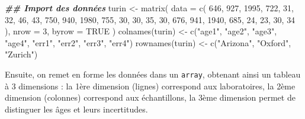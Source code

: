 \documentclass[
  french,
]{scrbook}
\newenvironment{Shaded}{\begin{snugshade}}{\end{snugshade}}
\newcommand{\AttributeTok}[1]{\textcolor[rgb]{0.77,0.63,0.00}{#1}}
\newcommand{\ConstantTok}[1]{\textcolor[rgb]{0.00,0.00,0.00}{#1}}
\newcommand{\DecValTok}[1]{\textcolor[rgb]{0.00,0.00,0.81}{#1}}
\newcommand{\DocumentationTok}[1]{\textcolor[rgb]{0.56,0.35,0.01}{\textbf{\textit{#1}}}}
\newcommand{\FunctionTok}[1]{\textcolor[rgb]{0.00,0.00,0.00}{#1}}
\newcommand{\NormalTok}[1]{#1}
\newcommand{\OtherTok}[1]{\textcolor[rgb]{0.56,0.35,0.01}{#1}}
\newcommand{\StringTok}[1]{\textcolor[rgb]{0.31,0.60,0.02}{#1}}
\begin{document}
\begin{Shaded}
\begin{Highlighting}[]
\DocumentationTok{\#\# Import des données}
\NormalTok{turin }\OtherTok{\textless{}{-}} \FunctionTok{matrix}\NormalTok{(}
  \AttributeTok{data =} \FunctionTok{c}\NormalTok{( }
    \DecValTok{646}\NormalTok{, }\DecValTok{927}\NormalTok{, }\DecValTok{1995}\NormalTok{, }\DecValTok{722}\NormalTok{, }\DecValTok{31}\NormalTok{, }\DecValTok{32}\NormalTok{, }\DecValTok{46}\NormalTok{, }\DecValTok{43}\NormalTok{,}
    \DecValTok{750}\NormalTok{, }\DecValTok{940}\NormalTok{, }\DecValTok{1980}\NormalTok{, }\DecValTok{755}\NormalTok{, }\DecValTok{30}\NormalTok{, }\DecValTok{30}\NormalTok{, }\DecValTok{35}\NormalTok{, }\DecValTok{30}\NormalTok{,}
    \DecValTok{676}\NormalTok{, }\DecValTok{941}\NormalTok{, }\DecValTok{1940}\NormalTok{, }\DecValTok{685}\NormalTok{, }\DecValTok{24}\NormalTok{, }\DecValTok{23}\NormalTok{, }\DecValTok{30}\NormalTok{, }\DecValTok{34}
\NormalTok{  ),}
  \AttributeTok{nrow =} \DecValTok{3}\NormalTok{,}
  \AttributeTok{byrow =} \ConstantTok{TRUE}
\NormalTok{)}
\FunctionTok{colnames}\NormalTok{(turin) }\OtherTok{\textless{}{-}} \FunctionTok{c}\NormalTok{(}\StringTok{"age1"}\NormalTok{, }\StringTok{"age2"}\NormalTok{, }\StringTok{"age3"}\NormalTok{, }\StringTok{"age4"}\NormalTok{, }
                     \StringTok{"err1"}\NormalTok{, }\StringTok{"err2"}\NormalTok{, }\StringTok{"err3"}\NormalTok{, }\StringTok{"err4"}\NormalTok{)}
\FunctionTok{rownames}\NormalTok{(turin) }\OtherTok{\textless{}{-}} \FunctionTok{c}\NormalTok{(}\StringTok{"Arizona"}\NormalTok{, }\StringTok{"Oxford"}\NormalTok{, }\StringTok{"Zurich"}\NormalTok{)}
\end{Highlighting}
\end{Shaded}

Ensuite, on remet en forme les données dans un \texttt{array}, obtenant ainsi un tableau à 3 dimensions : la 1ère dimension (lignes) correspond aux laboratoires, la 2ème dimension (colonnes) correspond aux échantillons, la 3ème dimension permet de distinguer les âges et leurs incertitudes.
\end{document}
